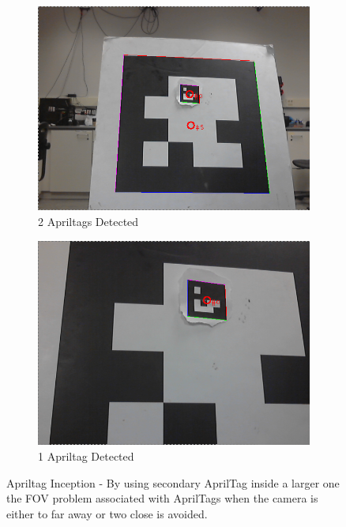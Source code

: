 \documentclass{article}[12pt]
\begin{document}
\begin{figure}[]
	\centering
	\begin{subfigure}[b]{0.45\linewidth}
		\includegraphics[width=\textwidth]{images/apriltags_1.png}
		\caption{2 Apriltags Detected}
	\end{subfigure}
	\begin{subfigure}[b]{0.45\linewidth}
		\includegraphics[width=\textwidth]{images/apriltags_3.png}
		\caption{1 Apriltag Detected }
	\end{subfigure}
	\caption{Apriltag Inception - By using secondary AprilTag inside a larger one the FOV problem associated with AprilTags when the camera is either to far away or two close is avoided.}
	\label{fig:apriltag}
\end{figure}
\end{document}
